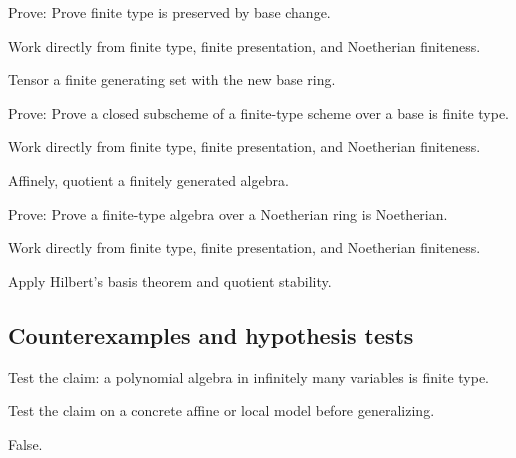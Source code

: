 \begin{exercise}\label{exr:vi26-expand-07}
Prove: Prove finite type is preserved by base change.
\end{exercise}
\begin{hint}
Work directly from finite type, finite presentation, and Noetherian finiteness.
\end{hint}
\begin{solution}
Tensor a finite generating set with the new base ring.
\end{solution}

\begin{exercise}\label{exr:vi26-expand-08}
Prove: Prove a closed subscheme of a finite-type scheme over a base is finite type.
\end{exercise}
\begin{hint}
Work directly from finite type, finite presentation, and Noetherian finiteness.
\end{hint}
\begin{solution}
Affinely, quotient a finitely generated algebra.
\end{solution}

\begin{exercise}\label{exr:vi26-expand-09}
Prove: Prove a finite-type algebra over a Noetherian ring is Noetherian.
\end{exercise}
\begin{hint}
Work directly from finite type, finite presentation, and Noetherian finiteness.
\end{hint}
\begin{solution}
Apply Hilbert's basis theorem and quotient stability.
\end{solution}

\subsection*{Counterexamples and hypothesis tests}

\begin{exercise}\label{exr:vi26-expand-10}
Test the claim: a polynomial algebra in infinitely many variables is finite type.
\end{exercise}
\begin{hint}
Test the claim on a concrete affine or local model before generalizing.
\end{hint}
\begin{solution}
False.
\end{solution}

